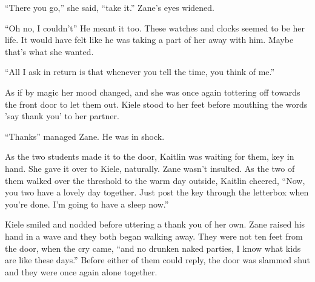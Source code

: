 ``There you go,'' she said, ``take it.''  Zane's eyes widened.  

``Oh no, I couldn't''  He meant it too.  These watches and clocks seemed to be her life.  It would have felt like he was taking a part of her away with him.  Maybe that's what she wanted.

``All I ask in return is that whenever you tell the time, you think of me.''

As if by magic her mood changed, and she was once again tottering off towards the front door to let them out.  Kiele stood to her feet before mouthing the words 'say thank you' to her partner.  

``Thanks'' managed Zane.  He was in shock.

As the two students made it to the door, Kaitlin was waiting for them, key in hand.  She gave it over to Kiele, naturally.  Zane wasn't insulted.  As the two of them walked over the threshold to the warm day outside, Kaitlin cheered, ``Now, you two have a lovely day together.  Just post the key through the letterbox when you're done.  I'm going to have a sleep now.''  

Kiele smiled and nodded before uttering a thank you of her own.  Zane raised his hand in a wave and they both began walking away.  They were not ten feet from the door, when the cry came, ``and no drunken naked parties, I know what kids are like these days.''  Before either of them could reply, the door was slammed shut and they were once again alone together.  



